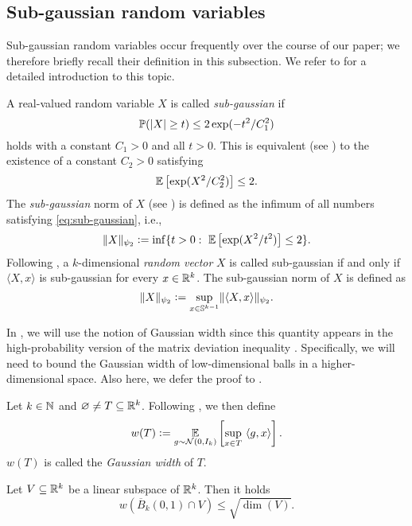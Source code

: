 \subsection{Sub-gaussian random variables }

Sub-gaussian random variables occur frequently over the course of our paper;
we therefore briefly recall their definition in this subsection.
We refer to  \cite[Chapters 2.5 and 3.4]{vershynin_high-dimensional_2018}
for a detailed introduction to this topic.

A real-valued random variable $X$ is called \emph{sub-gaussian} if 
\begin{equation*}
  \mathbb{P} (\vert X \vert \geq t ) \leq 2 \exp(-t^2 / C_1^2)
\end{equation*}
holds with a constant $C_1 > 0$ and all $t > 0$.
This is equivalent (see \cite[Proposition~2.5.2]{vershynin_high-dimensional_2018}) to the existence of a constant $C_2>0$ satisfying
\begin{equation}\label{eq:sub-gaussian}
  \mathbb{E} \left[ \exp(X^2 / C_2^2)\right] \leq 2.
\end{equation}
The \emph{sub-gaussian} norm of $X$ (see \cite[Equation~(2.13)]{vershynin_high-dimensional_2018}) is defined as the infimum of all numbers
satisfying \eqref{eq:sub-gaussian}, i.e.,
\begin{equation*}
  \Vert X \Vert_{\psi_2}
  \mathrel{\mathop:}= \inf \{t >0: \ \mathbb{E} \left[ \exp(X^2 / t^2)\right] \leq 2\}.
\end{equation*}
Following \cite[Definition~3.4.1]{vershynin_high-dimensional_2018}, a $k$-dimensional \emph{random vector} $X$ is called sub-gaussian
if and only if $\langle X,x \rangle$ is sub-gaussian for every $x \in \mathbb{R}^k$.
The sub-gaussian norm of $X$ is defined as
\begin{equation*}
  \Vert X \Vert_{\psi_2}
  \mathrel{\mathop:}= \underset{x \in \mathbb{S}^{k-1}}{\sup} \Vert \langle X,x \rangle \Vert_{\psi_2}.
\end{equation*}

In , we will use the notion of Gaussian width since this quantity appears in the high-probability version of the matrix deviation inequality \cite[Theorem~3]{Liaw2017}. Specifically, we will need to bound the Gaussian width of low-dimensional balls in a higher-dimensional space. Also here, we defer the proof to .
\begin{proposition}\label{prop:gauss_width}
Let $k \in \mathbb{N}$ and $\varnothing \neq T \subseteq \mathbb{R}^k$. Following \cite[Definition~7.5.1]{vershynin_high-dimensional_2018}, we then define
\begin{align*}
w(T) \mathrel{\mathop:}=  \underset{g \sim \mathcal{N}(0, I_k)}{\mathbb{E}}  \left[ \underset{x \in T}{\sup}\  \langle g, x \rangle \right].
\end{align*}
$w(T)$ is called the \emph{Gaussian width} of $T$. 

Let $V \subseteq \mathbb{R}^k$ be a linear subspace of $\mathbb{R}^k$. Then it holds
\begin{equation*}
w(\overline{B}_k(0,1) \cap V) \leq \sqrt{\dim(V)}.
\end{equation*}
\end{proposition}

